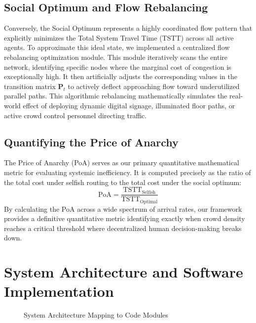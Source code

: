 \documentclass[conference]{IEEEtran}
\begin{document}
\subsection{Social Optimum and Flow Rebalancing}
Conversely, the Social Optimum represents a highly coordinated flow pattern that explicitly minimizes the Total System Travel Time (TSTT) across all active agents. To approximate this ideal state, we implemented a centralized flow rebalancing optimization module. This module iteratively scans the entire network, identifying specific nodes where the marginal cost of congestion is exceptionally high. It then artificially adjusts the corresponding values in the transition matrix $\mathbf{P}_t$ to actively deflect approaching flow toward underutilized parallel paths. This algorithmic rebalancing mathematically simulates the real-world effect of deploying dynamic digital signage, illuminated floor paths, or active crowd control personnel directing traffic.

\subsection{Quantifying the Price of Anarchy}
The Price of Anarchy (PoA) serves as our primary quantitative mathematical metric for evaluating systemic inefficiency. It is computed precisely as the ratio of the total cost under selfish routing to the total cost under the social optimum:
\begin{equation}
\text{PoA} = \frac{\text{TSTT}_{\text{Selfish}}}{\text{TSTT}_{\text{Optimal}}}
\end{equation}
By calculating the PoA across a wide spectrum of arrival rates, our framework provides a definitive quantitative metric identifying exactly when crowd density reaches a critical threshold where decentralized human decision-making breaks down.

\section{System Architecture and Software Implementation}

\begin{figure}[htbp]
\centering
{}
\caption{System Architecture Mapping to Code Modules}
\label{fig:arch}
\end{figure}
\end{document}
